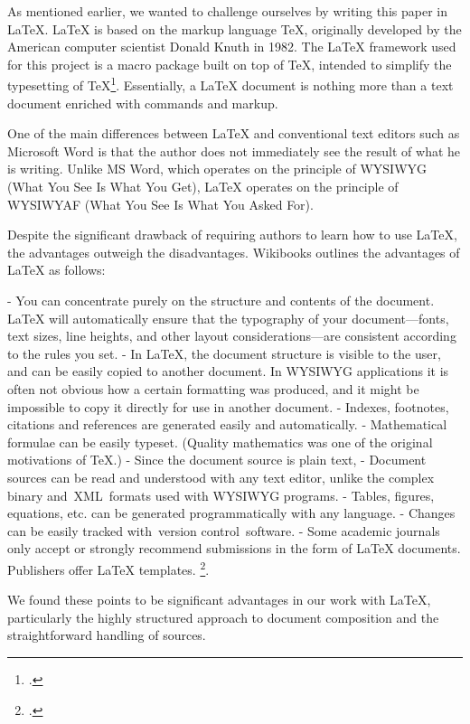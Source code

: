 As mentioned earlier, we wanted to challenge ourselves by writing this paper in \LaTeX{}. \LaTeX{} is based on the markup language TeX, originally developed by the American computer scientist Donald Knuth in 1982. The \LaTeX{} framework used for this project is \dq a macro package built on top of TeX\dq , intended to \dq simplify the typesetting of TeX\dq \footcite{wikibooks_latex_nodate}. Essentially, a \LaTeX{} document is nothing more than a text document enriched with commands and markup.

One of the main differences between \LaTeX{} and conventional text editors such as Microsoft Word is that the author does not immediately see the result of what he is writing. Unlike MS Word, which operates on the principle of WYSIWYG (What You See Is What You Get), \LaTeX{} operates on the principle of WYSIWYAF (What You See Is What You Asked For).

Despite the significant drawback of requiring authors to learn how to use \LaTeX{}, the advantages outweigh the disadvantages. Wikibooks outlines the advantages of \LaTeX{} as follows:

- You can concentrate purely on the structure and contents of the document. \LaTeX{} will automatically ensure that the typography of your document—fonts, text sizes, line heights, and other layout considerations—are consistent according to the rules you set.
- In \LaTeX{}, the document structure is visible to the user, and can be easily copied to another document. In WYSIWYG applications it is often not obvious how a certain formatting was produced, and it might be impossible to copy it directly for use in another document.
- Indexes, footnotes, citations and references are generated easily and automatically.
- Mathematical formulae can be easily typeset. (Quality mathematics was one of the original motivations of TeX.)
- Since the document source is plain text,
    - Document sources can be read and understood with any text editor, unlike the complex binary and XML formats used with WYSIWYG programs.
    - Tables, figures, equations, etc. can be generated programmatically with any language.
    - Changes can be easily tracked with version control software.
- Some academic journals only accept or strongly recommend submissions in the form of \LaTeX{} documents. Publishers offer \LaTeX{} templates.
\footcite{wikibooks_latex_nodate}.

We found these points to be significant advantages in our work with \LaTeX{}, particularly the highly structured approach to document composition and the straightforward handling of sources.

